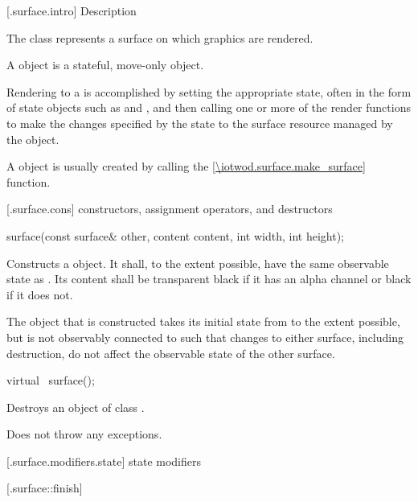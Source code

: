  [\iotwod.surface.intro] { Description}

\pnum
{}
The  class represents a surface on which graphics are rendered.

\pnum
A  object is a stateful, move-only object.

\pnum
Rendering to a  is accomplished by setting the appropriate state, often in the form of state objects such as  and , and then calling one or more of the render functions to make the changes specified by the state to the surface resource managed by the  object.

\pnum
A  object is usually created by calling the  \ref{\iotwod.surface.make_surface} function.

 [\iotwod.surface.cons] { constructors, assignment operators, and destructors}

%
\begin{itemdecl}
surface(const surface& other, content content, int width, int height);
\end{itemdecl}
\begin{itemdescr}
	\pnum
	\effects
	Constructs a  object. It shall, to the extent possible, have the same observable state as . Its content shall be transparent black if it has an alpha channel or black if it does not.
	
	\pnum
	\remarks
	The  object that is constructed takes its initial state from  to the extent possible, but is not observably connected to  such that changes to either surface, including destruction, do not affect the observable state of the other surface.
\end{itemdescr}

%
\begin{itemdecl}
virtual ~surface();
\end{itemdecl}
\begin{itemdescr}
	\pnum
	\effects
	Destroys an object of class .
	
	\pnum
	\remarks
	Does not throw any exceptions.
\end{itemdescr}

 [\iotwod.surface.modifiers.state] { state modifiers}

 [\iotwod.surface::finish] {}

